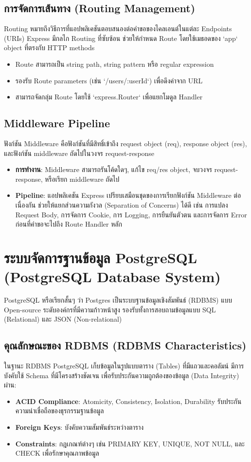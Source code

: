 \subsection{การจัดการเส้นทาง (Routing Management)}
Routing หมายถึงวิธีการที่แอปพลิเคชันตอบสนองต่อคำขอของไคลเอนต์ในแต่ละ Endpoints (URIs) Express มีกลไก Routing ที่ซับซ้อน ช่วยให้กำหนด Route โดยใช้เมธอดของ `app` object ที่ตรงกับ HTTP methods
\begin{itemize}
    \item Route สามารถเป็น string path, string pattern หรือ regular expression
    \item รองรับ Route parameters (เช่น `/users/:userId`) เพื่อดึงค่าจาก URL
    \item สามารถจัดกลุ่ม Route โดยใช้ `express.Router` เพื่อแยกโมดูล Handler
\end{itemize}

\subsection{Middleware Pipeline}
ฟังก์ชัน Middleware คือฟังก์ชันที่มีสิทธิ์เข้าถึง request object (req), response object (res), และฟังก์ชัน middleware ถัดไปในวงจร request-response
\begin{itemize}
    \item \textbf{การทำงาน}: Middleware สามารถรันโค้ดใดๆ, แก้ไข req/res object, จบวงจร request-response, หรือเรียก middleware ถัดไป
    \item \textbf{Pipeline}: แอปพลิเคชัน Express เปรียบเสมือนชุดของการเรียกฟังก์ชัน Middleware ต่อเนื่องกัน ช่วยให้แยกส่วนความกังวล (Separation of Concerns) ได้ดี เช่น การแปลง Request Body, การจัดการ Cookie, การ Logging, การยืนยันตัวตน และการจัดการ Error ก่อนที่คำขอจะไปถึง Route Handler หลัก
\end{itemize}

\section{ระบบจัดการฐานข้อมูล PostgreSQL (PostgreSQL Database System)}
PostgreSQL หรือเรียกสั้นๆ ว่า Postgres เป็นระบบฐานข้อมูลเชิงสัมพันธ์ (RDBMS) แบบ Open-source ระดับองค์กรที่มีความก้าวหน้าสูง รองรับทั้งการสอบถามข้อมูลแบบ SQL (Relational) และ JSON (Non-relational)

\subsection{คุณลักษณะของ RDBMS (RDBMS Characteristics)}
ในฐานะ RDBMS PostgreSQL เก็บข้อมูลในรูปแบบตาราง (Tables) ที่มีแถวและคอลัมน์ มีการบังคับใช้ Schema ที่มีโครงสร้างชัดเจน เพื่อรับประกันความถูกต้องของข้อมูล (Data Integrity) ผ่าน:
\begin{itemize}
    \item \textbf{ACID Compliance}: Atomicity, Consistency, Isolation, Durability รับประกันความน่าเชื่อถือของธุรกรรมฐานข้อมูล
    \item \textbf{Foreign Keys}: บังคับความสัมพันธ์ระหว่างตาราง
    \item \textbf{Constraints}: กฎเกณฑ์ต่างๆ เช่น PRIMARY KEY, UNIQUE, NOT NULL, และ CHECK เพื่อรักษาคุณภาพข้อมูล
\end{itemize}

